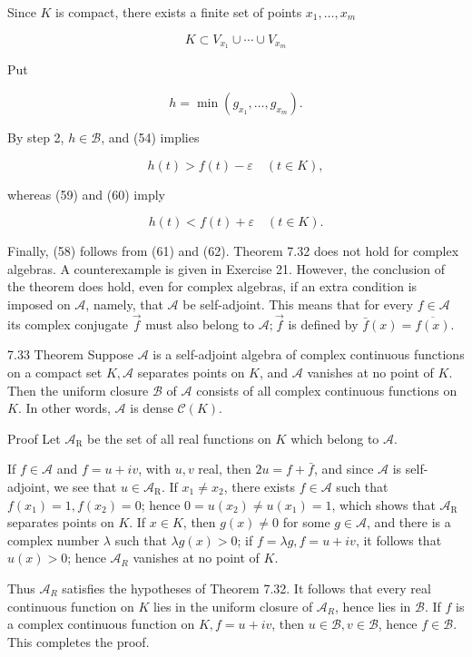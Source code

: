 \documentclass[10pt]{article}
\begin{document}
Since $K$ is compact, there exists a finite set of points $x_{1}, \ldots, x_{m}$

$$
K \subset V_{x_{1}} \cup \cdots \cup V_{x_{m}}
$$

Put

$$
h=\min \left(g_{x_{1}}, \ldots, g_{x_{m}}\right) .
$$

By step 2, $h \in \mathscr{B}$, and (54) implies

$$
h(t)>f(t)-\varepsilon \quad(t \in K),
$$

whereas (59) and (60) imply

$$
h(t)<f(t)+\varepsilon \quad(t \in K) .
$$

Finally, (58) follows from (61) and (62). Theorem 7.32 does not hold for complex algebras. A counterexample is given in Exercise 21. However, the conclusion of the theorem does hold, even for complex algebras, if an extra condition is imposed on $\mathscr{A}$, namely, that $\mathscr{A}$ be self-adjoint. This means that for every $f \in \mathscr{A}$ its complex conjugate $\vec{f}$ must also belong to $\mathscr{A} ; \vec{f}$ is defined by $\bar{f}(x)=\overline{f(x)}$.

7.33 Theorem Suppose $\mathscr{A}$ is a self-adjoint algebra of complex continuous functions on a compact set $K, \mathscr{A}$ separates points on $K$, and $\mathscr{A}$ vanishes at no point of $K$. Then the uniform closure $\mathscr{B}$ of $\mathscr{A}$ consists of all complex continuous functions on $K$. In other words, $\mathscr{A}$ is dense $\mathscr{C}(K)$.

Proof Let $\mathscr{A}_{\mathrm{R}}$ be the set of all real functions on $K$ which belong to $\mathscr{A}$.

If $f \in \mathscr{A}$ and $f=u+i v$, with $u, v$ real, then $2 u=f+\bar{f}$, and since $\mathscr{A}$ is self-adjoint, we see that $u \in \mathscr{A}_{\mathrm{R}}$. If $x_{1} \neq x_{2}$, there exists $f \in \mathscr{A}$ such that $f\left(x_{1}\right)=1, f\left(x_{2}\right)=0$; hence $0=u\left(x_{2}\right) \neq u\left(x_{1}\right)=1$, which shows that $\mathscr{A}_{\mathrm{R}}$ separates points on $K$. If $x \in K$, then $g(x) \neq 0$ for some $g \in \mathscr{A}$, and there is a complex number $\lambda$ such that $\lambda g(x)>0$; if $f=\lambda g, f=u+i v$, it follows that $u(x)>0$; hence $\mathscr{A}_{R}$ vanishes at no point of $K$.

Thus $\mathscr{A}_{R}$ satisfies the hypotheses of Theorem 7.32. It follows that every real continuous function on $K$ lies in the uniform closure of $\mathscr{A}_{R}$, hence lies in $\mathscr{B}$. If $f$ is a complex continuous function on $K, f=u+i v$, then $u \in \mathscr{B}, v \in \mathscr{B}$, hence $f \in \mathscr{B}$. This completes the proof.
\end{document}
